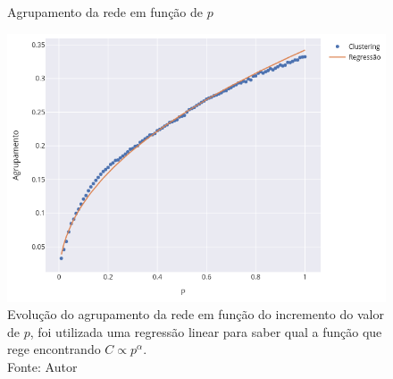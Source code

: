 \begin{figure}[H]
    \centering
    \captionsetup{font=normalsize,skip=0.8pt,singlelinecheck=on,labelsep=endash}
    \caption{Agrupamento da rede em função de $p$}
    \includegraphics[scale= 0.5]{figuras/clustering_vs_p-PIF.png}
    \captionsetup{font=small,justification=justified}    \caption*{Evolução do agrupamento da rede em função 
    do incremento do valor de $p$, foi utilizada uma regressão linear para saber qual a função que rege encontrando $C \propto p^{\alpha}$.\\Fonte: Autor}
    \label{fig:regressao}
\end{figure}


